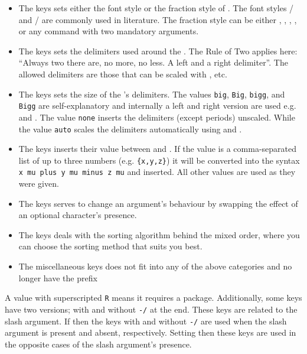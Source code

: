 	\begin{itemize}
		\item The  keys sets either the font style or the fraction style of \meta{\dots}. The font styles / and / are commonly used in literature. The fraction style can be either , , , \req{},  or any command with two mandatory arguments.
		\item The  keys sets the delimiters used around the \meta{\dots}. The Rule of Two applies here: \enquote{Always two there are, no more, no less. A left and a right delimiter}. The allowed delimiters are those that can be scaled with ,  etc.
		\item The  keys sets the size of the \meta{\dots}'s delimiters. The values \texttt{big}, \texttt{Big}, \texttt{bigg}, and \texttt{Bigg} are self-explanatory and internally a left and right version are used e.g.  and . The value \texttt{none} inserts the delimiters (except periods) unscaled. While the value \texttt{auto} scales the delimiters automatically using  and .
		\item The  keys inserts their value between \meta{\dots} and \meta{\dots}. If the value is a comma-separated list of up to three numbers (e.g. \texttt{\{x,y,z\}}) it will be converted into the syntax \texttt{ x mu plus y mu minus z mu} and inserted. All other values are used as they were given.
		\item The  keys serves to change an argument's behaviour by swapping the effect of an optional character's presence.
		\item The  keys deals with the sorting algorithm behind the mixed order, where you can choose the sorting method that suits you best.
		\item The miscellaneous keys does not fit into any of the above categories and no longer have the prefix 
	\end{itemize}
	
	\begin{note}
		A value with superscripted \texttt{R} means it requires a package. Additionally, some keys have two versions; with and without \texttt{-/} at the end. These keys are related to the slash argument. If  then the keys with and without \texttt{-/} are used when the slash argument is present and absent, respectively. Setting  then these keys are used in the opposite cases of the slash argument's presence.
	\end{note}
	
